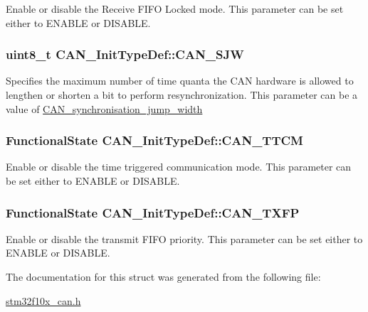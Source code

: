 \label{structCAN__InitTypeDef_aa63787683c0ad533b513fb60355d76f1}
Enable or disable the Receive FIFO Locked mode. This parameter can be set either to ENABLE or DISABLE. \hypertarget{structCAN__InitTypeDef_addac271c43490cb37ac7293f7bf201c2}{
\subsubsection[{CAN\_\-SJW}]{\setlength{\rightskip}{0pt plus 5cm}uint8\_\-t {\bf CAN\_\-InitTypeDef::CAN\_\-SJW}}}
\label{structCAN__InitTypeDef_addac271c43490cb37ac7293f7bf201c2}
Specifies the maximum number of time quanta the CAN hardware is allowed to lengthen or shorten a bit to perform resynchronization. This parameter can be a value of \hyperlink{group__CAN__synchronisation__jump__width}{CAN\_\-synchronisation\_\-jump\_\-width} \hypertarget{structCAN__InitTypeDef_aa53ceafdcf1a9a5c9a6566006c9a4b60}{
\subsubsection[{CAN\_\-TTCM}]{\setlength{\rightskip}{0pt plus 5cm}FunctionalState {\bf CAN\_\-InitTypeDef::CAN\_\-TTCM}}}
\label{structCAN__InitTypeDef_aa53ceafdcf1a9a5c9a6566006c9a4b60}
Enable or disable the time triggered communication mode. This parameter can be set either to ENABLE or DISABLE. \hypertarget{structCAN__InitTypeDef_a003de4b70fc93b4f820f320c6ea75a16}{
\subsubsection[{CAN\_\-TXFP}]{\setlength{\rightskip}{0pt plus 5cm}FunctionalState {\bf CAN\_\-InitTypeDef::CAN\_\-TXFP}}}
\label{structCAN__InitTypeDef_a003de4b70fc93b4f820f320c6ea75a16}
Enable or disable the transmit FIFO priority. This parameter can be set either to ENABLE or DISABLE. 

The documentation for this struct was generated from the following file:\begin{DoxyCompactItemize}
\item 
\hyperlink{stm32f10x__can_8h}{stm32f10x\_\-can.h}\end{DoxyCompactItemize}
